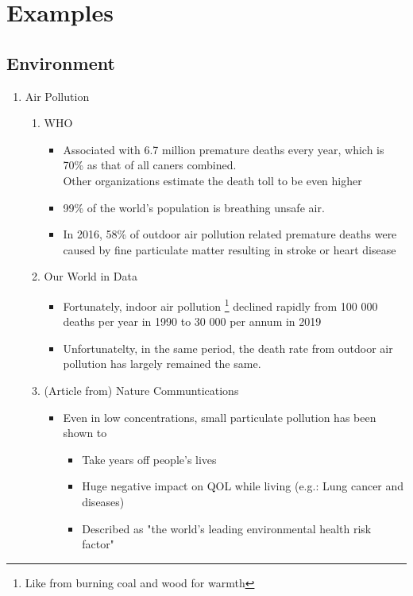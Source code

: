 \documentclass[oneside]{book}
\begin{document}
\section{Examples}
\subsection{Environment}
\begin{enumerate}
    \item Air Pollution
    \begin{enumerate}
        \item WHO \begin{itemize}
            \item Associated with 6.7 million premature deaths every year, which is 70\% as that of all caners combined.\\
            Other organizations estimate the death toll to be even higher
           \item 99\% of the world's population is breathing unsafe air.
           \item In 2016, 58\% of outdoor air pollution related premature deaths were caused by fine particulate matter resulting in stroke or heart disease 
        \end{itemize} 
        \item Our World in Data
        \begin{itemize}
            \item Fortunately, indoor air pollution \footnote{Like from burning coal and wood for warmth} declined rapidly from 100 000 deaths per year in 1990 to 30 000 per annum in 2019
            \item Unfortunatelty, in the same period, the death rate from outdoor air pollution has largely remained the same.
        \end{itemize}
        \item (Article from) Nature Communtications \begin{itemize}
            \item Even in low concentrations, small particulate pollution has been shown to 
            \begin{itemize}
                \item Take years off people's lives
                \item Huge negative impact on QOL while living \footnotesize (e.g.: Lung cancer and diseases) \normalsize
                \item Described as "the world's leading environmental health risk factor" 

\end{itemize}
\end{itemize}
\end{enumerate}
\end{enumerate}
\end{document}
